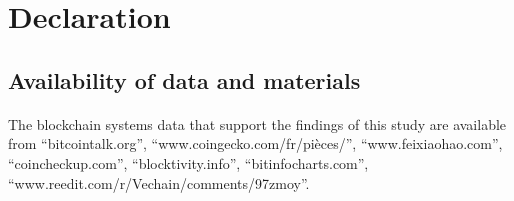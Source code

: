 \documentclass[doublespacing]{bmcart}
\begin{document}
\begin{CJK*}{UTF8}{gbsn}



\renewcommand\thesection{\Roman{section}}
\renewcommand\thesubsection{\Roman{section}.\alph{subsection}}

\paragraph{}

\section*{\centering Declaration}
\subsection*{\centering Availability of data and materials}

\paragraph{}
	The blockchain systems data that support the findings of this study are available from ``bitcointalk.org'', ``www.coingecko.com/fr/pièces/'', ``www.feixiaohao.com'', ``coincheckup.com'', ``blocktivity.info'', ``bitinfocharts.com'', \\``www.reedit.com/r/Vechain/comments/97zmoy''.

\end{CJK*}
\end{document}
